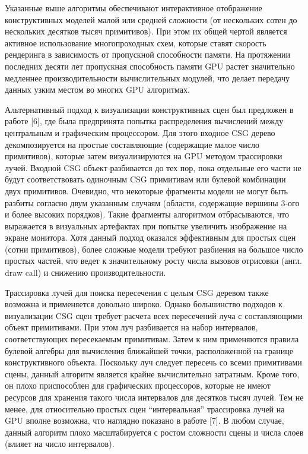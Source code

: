 {{{{




Указанные выше алгоритмы обеспечивают интерактивное отображение конструктивных моделей малой или средней  сложности (от нескольких сотен до нескольких десятков тысяч примитивов). При этом их общей чертой является активное использование многопроходных схем, которые ставят скорость рендеринга в зависимость от пропускной способности памяти. На протяжении последних десяти лет пропускная способность памяти GPU растет значительно медленнее производительности вычислительных модулей,  что делает передачу данных узким местом во многих GPU алгоритмах.

Альтернативный подход к визуализации конструктивных сцен был предложен в работе [6], где была предпринята попытка распределения вычислений между центральным и графическим процессором. Для этого входное CSG дерево декомпозируется на простые составляющие (содержащие малое число примитивов), которые затем визуализируются на GPU методом трассировки лучей. Входной CSG объект разбивается до тех пор, пока отдельные его части не будут соответствовать одиночным CSG примитивам или булевой  комбинации двух примитивов. Очевидно, что некоторые фрагменты модели не могут быть разбиты согласно двум указанным случаям (области, содержащие вершины 3-ого и более высоких порядков). Такие фрагменты алгоритмом отбрасываются, что выражается в визуальных артефактах при попытке увеличить изображение на экране монитора. Хотя данный подход оказался эффективным для простых сцен (сотни примитивов), более сложные модели требуют разбиения на большое число простых частей, что ведет к значительному росту числа вызовов отрисовки (англ. draw call) и снижению производительности.

Трассировка лучей для поиска пересечения с целым CSG деревом также возможна и применяется довольно широко. Однако большинство подходов к визуализации CSG сцен требует расчета всех пересечений луча с составляющими объект примитивами. При этом луч разбивается на набор интервалов, соответствующих пересекаемым примитивам. Затем к ним применяются правила булевой алгебры для вычисления ближайшей точки, расположенной на границе конструктивного объекта. Поскольку луч следует пересечь со всеми примитивами сцены, данный алгоритм является крайне вычислительно затратным. Кроме того, он плохо приспособлен для графических процессоров, которые не имеют ресурсов для хранения такого числа интервалов для десятков тысяч лучей. Тем не менее, для относительно простых сцен “интервальная” трассировка лучей на GPU вполне возможна, что наглядно показано в работе [7]. В любом случае, данный алгоритм плохо масштабируется с ростом сложности сцены и числа слоев (влияет на число интервалов).

}}}}
